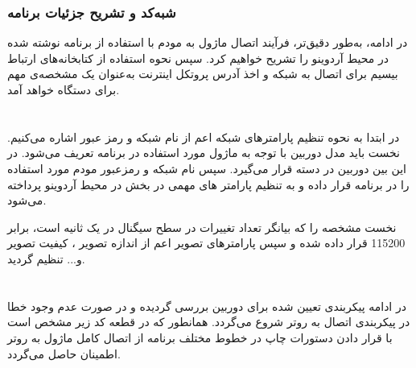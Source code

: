 \subsubsection{شبه‌کد و تشریح جزئیات برنامه}
\label{تشریح اتصال دوربین}
در ادامه، به‌طور دقیق‌تر، فرآیند اتصال ماژول به مودم با استفاده از برنامه نوشته شده در محیط آردوینو را تشریح خواهیم کرد. سپس نحوه استفاده از کتابخانه‌های ارتباط بیسیم برای اتصال به شبکه و اخذ آدرس پروتکل اینترنت  به‌عنوان یک مشخصه‌ی مهم برای دستگاه خواهد آمد.

\section*{}
\begin{latin}
	
\end{latin}
در ابتدا به نحوه تنظیم پارامترهای شبکه اعم از نام شبکه  و رمز عبور  اشاره می‌کنیم. 
نخست باید مدل دوربین با توجه به ماژول مورد استفاده در برنامه تعریف می‌شود. در این بین دوربین  در دسته  قرار می‌گیرد. سپس نام شبکه و رمزعبور مودم مورد استفاده را در برنامه قرار داده و به تنظیم پارامتر های مهمی در بخش  در محیط آردوینو پرداخته می‌شود.

نخست مشخصه  را که بیانگر تعداد تغییرات در سطح سیگنال در یک ثانیه است، برابر 115200 قرار داده شده و سپس پارامترهای تصویر اعم از اندازه تصویر
\noindent\unskip{}،
کیفیت تصویر
\noindent\unskip{}
و... تنظیم گردید. 

\section*{}
\begin{latin}
	
\end{latin}

در ادامه پیکربندی تعیین شده برای دوربین بررسی گردیده و در صورت عدم وجود خطا در پیکربندی اتصال به روتر شروع می‌گردد. همانطور که در قطعه کد زیر مشخص است با قرار دادن دستورات چاپ در خطوط مختلف برنامه از اتصال کامل ماژول به روتر اطمینان حاصل می‌گردد.
